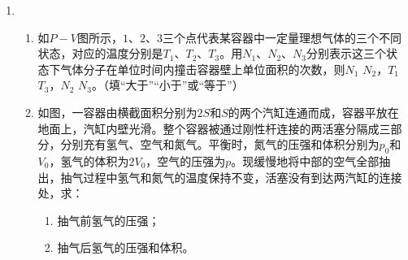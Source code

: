 \begin{enumerate}[leftmargin=0em]


\item 
{}
\begin{enumerate}
\renewcommand{\labelenumi}{\arabic{enumi}.}
\item
如$ P-V $图所示，$ 1 $、$ 2 $、$ 3 $三个点代表某容器中一定量理想气体的三个不同状态，对应的温度分别是$ T_{1} $、$ T_{2} $、$ T_{3} $。用$ N_{1} $、$ N_{2} $、$ N_{3} $分别表示这三个状态下气体分子在单位时间内撞击容器壁上单位面积的次数，则$ N_1 $  $ N_2 $，$ T_1 $  $ T_{3} $，$ N_2 $  $ N_3 $。（填“大于”“小于”或“等于”）
\begin{figure}[h!]
\centering

\end{figure}




\item 
如图，一容器由横截面积分别为$ 2S $和$ S $的两个汽缸连通而成，容器平放在地面上，汽缸内壁光滑。整个容器被通过刚性杆连接的两活塞分隔成三部分，分别充有氢气、空气和氮气。平衡时，氮气的压强和体积分别为$ p_{0} $和$ V_{0} $，氢气的体积为$ 2 V_0 $，空气的压强为$ p $。现缓慢地将中部的空气全部抽出，抽气过程中氢气和氮气的温度保持不变，活塞没有到达两汽缸的连接处，求：
\begin{enumerate}
\renewcommand{\labelenumi}{\arabic{enumi}.}
\item
抽气前氢气的压强；
\item 
抽气后氢气的压强和体积。



\end{enumerate}
\end{enumerate}
\end{enumerate}
